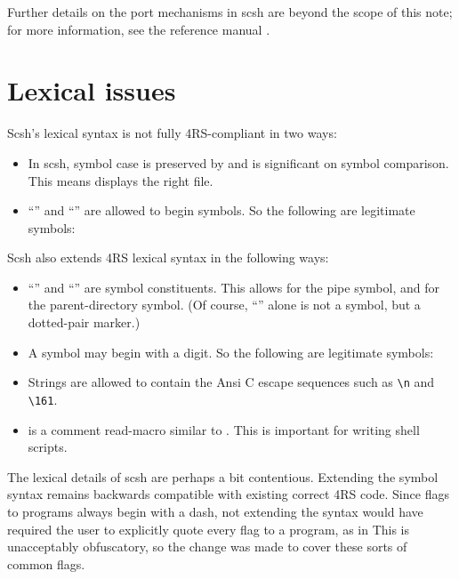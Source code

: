 Further details on the port mechanisms in scsh are beyond the scope of
this note; for more information, see the reference manual \cite{ref-man}.


\section{Lexical issues}
\label{sec:lex}

Scsh's lexical syntax is not fully {\R4RS}-compliant in two ways:
\begin{itemize}
\item In scsh, symbol case is preserved by  and is significant on
      symbol comparison. This means 
      displays the right file.

\item ``\ex{-}'' and ``\ex{+}'' are allowed to begin symbols. 
      So the following are legitimate symbols:
\end{itemize}
%
Scsh also extends {\R4RS} lexical syntax in the following ways:
\begin{itemize}
\item ``\ex{|}'' and ``'' are symbol constituents.
  This allows \ex{|} for the pipe symbol, and  for the parent-directory
  symbol. (Of course, ``'' alone is not a symbol, but a 
  dotted-pair marker.)

\item A symbol may begin with a digit.
      So the following are legitimate symbols:

\item Strings are allowed to contain the {\sc Ansi} C escape sequences
      such as \verb|\n| and \verb|\161|.
        
\item \cd{#!} is a comment read-macro similar to \ex{;}. 
      This is important for writing shell scripts.
\end{itemize}

The lexical details of scsh are perhaps a bit contentious.
Extending the symbol syntax remains backwards compatible
with existing correct {\R4RS} code.
Since flags to {\Unix} programs always begin with a dash,
not extending the syntax would have required the user to explicitly
quote every flag to a program, as in
This is unacceptably obfuscatory, so the change was made to cover
these sorts of common {\Unix} flags.

